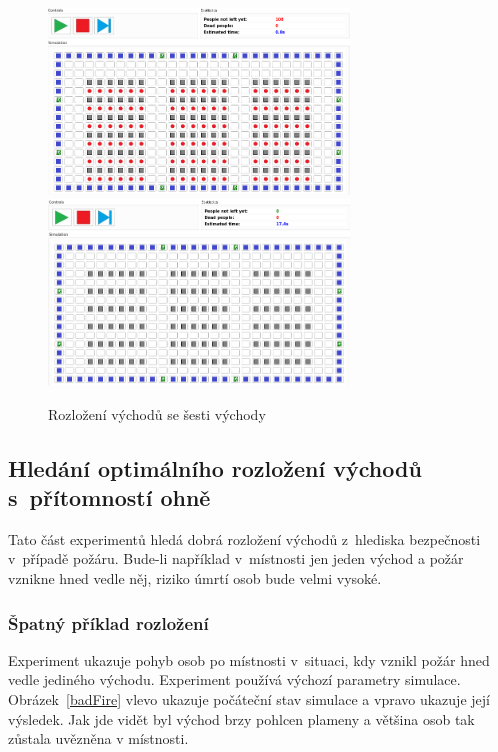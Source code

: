 \documentclass[11pt, titlepage, a4paper]{article}
\begin{document}
        \begin{figure}[H]
            \includegraphics[width=8cm]{ExitDistribution/ExitDistribSeven}
            \includegraphics[width=8cm]{ExitDistribution/ExitDistribSevenEnd}
            \caption{Rozložení východů se šesti východy}
            \label{testExits7}
        \end{figure}

    \subsection{Hledání optimálního rozložení východů s~přítomností ohně}
    Tato část experimentů hledá dobrá rozložení východů z~hlediska bezpečnosti v~případě požáru. Bude-li například v~místnosti jen jeden východ a požár vznikne hned vedle něj, riziko úmrtí osob bude velmi vysoké.

        \subsubsection{Špatný příklad rozložení}
        Experiment ukazuje pohyb osob po místnosti v~situaci, kdy vznikl požár hned vedle jediného východu. Experiment používá výchozí parametry simulace. Obrázek~\ref{badFire} vlevo ukazuje počáteční stav simulace a vpravo ukazuje její výsledek. Jak jde vidět byl východ brzy pohlcen plameny a většina osob tak zůstala uvězněna v místnosti.\\
\end{document}
